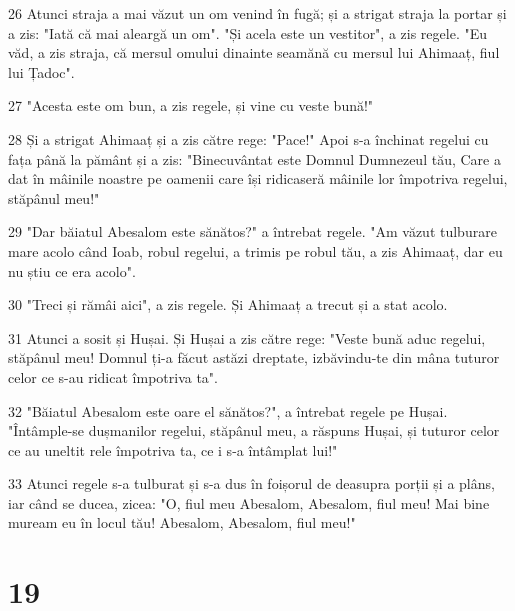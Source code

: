 \par 26 Atunci straja a mai văzut un om venind în fugă; și a strigat straja la portar și a zis: "Iată că mai aleargă un om". "Și acela este un vestitor", a zis regele. "Eu văd, a zis straja, că mersul omului dinainte seamănă cu mersul lui Ahimaaț, fiul lui Țadoc".
\par 27 "Acesta este om bun, a zis regele, și vine cu veste bună!"
\par 28 Și a strigat Ahimaaț și a zis către rege: "Pace!" Apoi s-a închinat regelui cu fața până la pământ și a zis: "Binecuvântat este Domnul Dumnezeul tău, Care a dat în mâinile noastre pe oamenii care își ridicaseră mâinile lor împotriva regelui, stăpânul meu!"
\par 29 "Dar băiatul Abesalom este sănătos?" a întrebat regele. "Am văzut tulburare mare acolo când Ioab, robul regelui, a trimis pe robul tău, a zis Ahimaaț, dar eu nu știu ce era acolo".
\par 30 "Treci și rămâi aici", a zis regele. Și Ahimaaț a trecut și a stat acolo.
\par 31 Atunci a sosit și Hușai. Și Hușai a zis către rege: "Veste bună aduc regelui, stăpânul meu! Domnul ți-a făcut astăzi dreptate, izbăvindu-te din mâna tuturor celor ce s-au ridicat împotriva ta".
\par 32 "Băiatul Abesalom este oare el sănătos?", a întrebat regele pe Hușai. "Întâmple-se dușmanilor regelui, stăpânul meu, a răspuns Hușai, și tuturor celor ce au uneltit rele împotriva ta, ce i s-a întâmplat lui!"
\par 33 Atunci regele s-a tulburat și s-a dus în foișorul de deasupra porții și a plâns, iar când se ducea, zicea: "O, fiul meu Abesalom, Abesalom, fiul meu! Mai bine muream eu în locul tău! Abesalom, Abesalom, fiul meu!"

\chapter{19}

